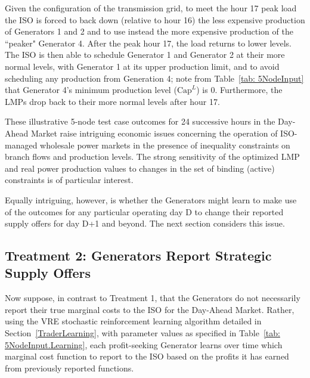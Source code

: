 \documentclass[12pt]{article}
\begin{document}
Given the configuration of the transmission grid, to meet the hour 17 peak load the ISO is forced to back down (relative to hour 16) the less expensive production of Generators 1 and 2 and to use instead the more expensive production of the ``peaker" Generator 4.  After the peak hour 17, the load returns to lower levels.  The ISO is then able to schedule Generator 1 and Generator 2 at their more normal levels, with Generator 1 at its upper production limit, and to avoid scheduling any production from Generation 4; note from Table~\ref{tab: 5NodeInput} that Generator 4's minimum production level ($\mbox{Cap}^L$) is 0.  Furthermore, the LMPs drop back to their more normal levels after hour 17.

     These illustrative 5-node test case outcomes for 24 successive hours in the Day-Ahead Market raise intriguing economic issues concerning the operation of ISO-managed wholesale power markets in the presence of inequality constraints on branch flows and production levels.  The strong sensitivity of the optimized LMP and real power production values to changes in the set of binding (active) constraints is of particular interest.   

     Equally intriguing, however, is whether the Generators might learn to make use of the outcomes for any particular operating day D to change their reported supply offers for day D+1 and beyond. The next section considers this issue.


\subsection{Treatment 2: Generators Report Strategic Supply Offers \label{5NodeCaseWithStrat} }
  
Now suppose, in contrast to Treatment 1, that the Generators do not necessarily report their true marginal costs to the ISO for the Day-Ahead Market.  Rather, using the VRE stochastic reinforcement learning algorithm detailed in 
Section~\ref{TraderLearning}, with parameter values as specified in Table~\ref{tab: 5NodeInput.Learning}, each profit-seeking Generator learns over time which marginal cost function to report to the ISO based on the profits it has earned from previously reported functions.  
 
\end{document}
